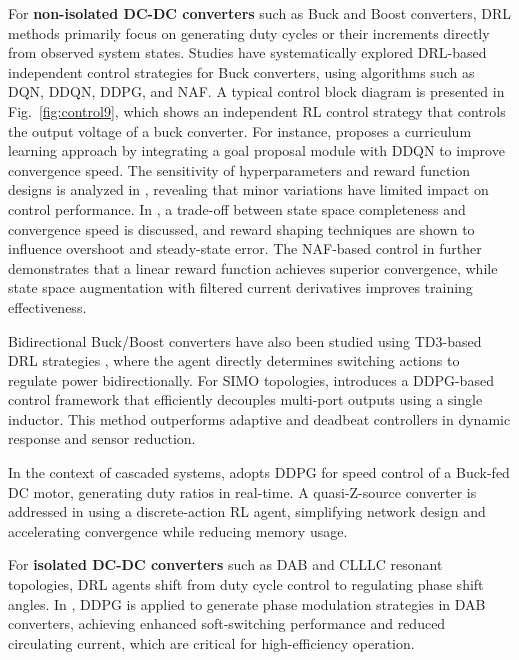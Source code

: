 For \textbf{non-isolated DC-DC converters} such as Buck and Boost converters, DRL methods primarily focus on generating duty cycles or their increments directly from observed system states. Studies \cite{9660319, 9752938, 10030117,9521987, zandi2023voltage, 10245391, 10264605, 10246775,chen2024asynchronous,li2023large} have systematically explored DRL-based independent control strategies for Buck converters, using algorithms such as DQN, DDQN, DDPG, and NAF. A typical control block diagram is presented in Fig.~\ref{fig:control9}, which shows an independent RL control strategy that controls the output voltage of a buck converter. For instance, \cite{9660319} proposes a curriculum learning approach by integrating a goal proposal module with DDQN to improve convergence speed. The sensitivity of hyperparameters and reward function designs is analyzed in \cite{9521987}, revealing that minor variations have limited impact on control performance. In \cite{10264605}, a trade-off between state space completeness and convergence speed is discussed, and reward shaping techniques are shown to influence overshoot and steady-state error. The NAF-based control in \cite{10246775} further demonstrates that a linear reward function achieves superior convergence, while state space augmentation with filtered current derivatives improves training effectiveness.

Bidirectional Buck/Boost converters have also been studied using TD3-based DRL strategies \cite{10141314}, where the agent directly determines switching actions to regulate power bidirectionally. For SIMO topologies, \cite{ye2024deep} introduces a DDPG-based control framework that efficiently decouples multi-port outputs using a single inductor. This method outperforms adaptive and deadbeat controllers in dynamic response and sensor reduction.

In the context of cascaded systems, \cite{anugula2021deep} adopts DDPG for speed control of a Buck-fed DC motor, generating duty ratios in real-time. A quasi-Z-source converter is addressed in \cite{zandi2023voltage} using a discrete-action RL agent, simplifying network design and accelerating convergence while reducing memory usage.

For \textbf{isolated DC-DC converters} such as DAB and CLLLC resonant topologies, DRL agents shift from duty cycle control to regulating phase shift angles. In \cite{wu2021innovative}, DDPG is applied to generate phase modulation strategies in DAB converters, achieving enhanced soft-switching performance and reduced circulating current, which are critical for high-efficiency operation.

